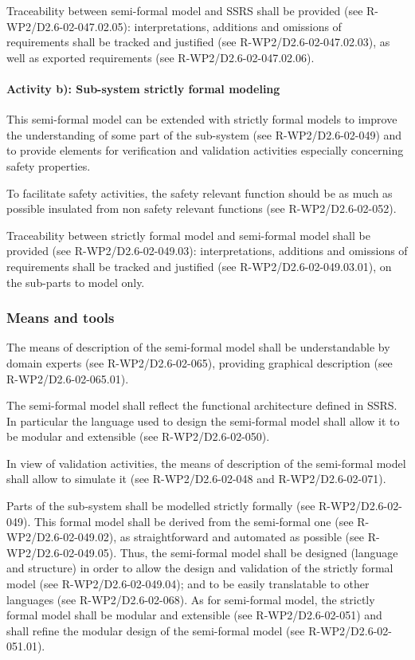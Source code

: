 Traceability between semi-formal model and SSRS shall be provided (see R-WP2/D2.6-02-047.02.05): interpretations, additions and omissions of requirements shall be tracked and justified (see R-WP2/D2.6-02-047.02.03), as well as exported requirements  (see R-WP2/D2.6-02-047.02.06).

\paragraph{Activity b): Sub-system strictly formal modeling} This semi-formal model can be extended with strictly formal models to improve the understanding of some part of the sub-system (see R-WP2/D2.6-02-049) and to  provide elements for verification and validation activities especially concerning safety properties.

To facilitate safety activities, the safety relevant function should be as much as possible insulated from non safety relevant functions (see R-WP2/D2.6-02-052).

Traceability between strictly formal model and semi-formal model shall be provided (see R-WP2/D2.6-02-049.03): interpretations, additions and omissions of requirements shall be tracked and justified (see R-WP2/D2.6-02-049.03.01), on the sub-parts to model only.

\subsubsection{Means and tools}

The means of description of the semi-formal model shall be understandable by domain experts (see R-WP2/D2.6-02-065), providing graphical  description (see R-WP2/D2.6-02-065.01).

The semi-formal model shall reflect the functional architecture defined in SSRS. In particular the language used to  design the semi-formal model shall allow it to be modular and extensible (see R-WP2/D2.6-02-050).

In view of validation activities, the means of description of the semi-formal model shall allow to simulate it (see R-WP2/D2.6-02-048 and R-WP2/D2.6-02-071).

Parts of the sub-system shall be modelled strictly formally (see R-WP2/D2.6-02-049). This formal model shall be derived from the semi-formal one (see R-WP2/D2.6-02-049.02), as straightforward and automated as possible (see R-WP2/D2.6-02-049.05). Thus, the semi-formal model shall be designed (language and structure) in order to allow the design and validation of the strictly formal model (see R-WP2/D2.6-02-049.04); and to be easily translatable to other languages (see R-WP2/D2.6-02-068).
As for semi-formal model, the strictly formal model shall be modular and extensible (see R-WP2/D2.6-02-051) and shall refine the modular design of the semi-formal model (see R-WP2/D2.6-02-051.01).


